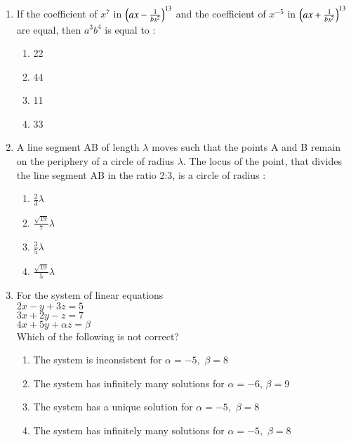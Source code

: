 \documentclass[journal]{IEEEtran}
\begin{document}
\begin{enumerate}
    \item If the coefficient of  $x^7$ in $\left(ax-\frac{1}{bx^2}\right)^{13}$ and the coefficient of $x^{-5}$ in $\left(ax+\frac{1}{bx^2}\right)^{13}$ are equal, then $a^3b^4$ is equal to :
\begin{multicols}{1}
            \begin{enumerate}
              \item 22
              \item  44
              \item  11
              \item 33
            \end{enumerate}
        \end{multicols}
    \item A line segment AB of length $\lambda$ moves such that the points A and B remain on the periphery of a circle of radius $\lambda$. The locus of the point, that divides the line segment AB in the ratio 2:3, is a circle of radius :
    \begin{multicols}{1}
            \begin{enumerate}
              \item $\frac{2}{3}\lambda$
              \item   $\frac{\sqrt{19}}{7}\lambda$
              \item   $\frac{3}{5}\lambda$
              \item  $\frac{\sqrt{19}}{5}\lambda$
            \end{enumerate}
        \end{multicols}
    \item For the system of linear equations \\
    $2x-y+3z=5$\\
    $3x+2y-z=7$\\
    $4x+5y+\alpha z=\beta$\\
    Which of the following is not correct?
    \begin{multicols}{1}
            \begin{enumerate}
              \item The system is inconsistent for $\alpha =-5,$ $\beta = 8$
              \item The system has infinitely many solutions for $\alpha =-6$, $\beta = 9$
              \item The system has a unique solution  for $\alpha =-5,$ $\beta = 8$
              \item The system has infinitely many solutions for $\alpha =-5,$ $\beta = 8$
            \end{enumerate}
        \end{multicols}
     

\end{enumerate}
\end{document}
